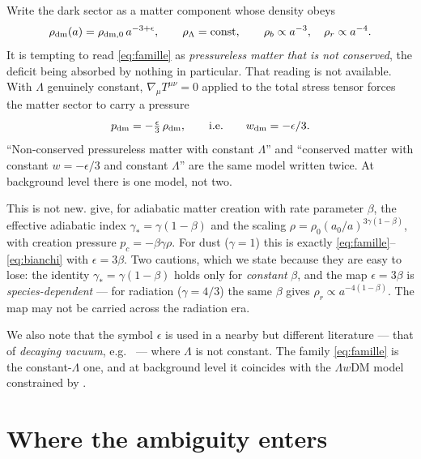 \documentclass[11pt,a4paper]{article}
\begin{document}
Write the dark sector as a matter component whose density obeys
\begin{equation}
\rho_{\rm dm}(a) = \rho_{{\rm dm},0}\,a^{-3+\epsilon},
\qquad
\rho_\Lambda = \text{const},
\qquad
\rho_b \propto a^{-3},\quad \rho_r\propto a^{-4}.
\label{eq:famille}
\end{equation}
It is tempting to read \eqref{eq:famille} as \emph{pressureless matter that is not
conserved}, the deficit being absorbed by nothing in particular. That reading is not
available. With $\Lambda$ genuinely constant, $\nabla_\mu T^{\mu\nu}=0$ applied to the total
stress tensor forces the matter sector to carry a pressure
\begin{equation}
p_{\rm dm} = -\tfrac{\epsilon}{3}\,\rho_{\rm dm},
\qquad\text{i.e.}\qquad
w_{\rm dm} = -\epsilon/3 .
\label{eq:bianchi}
\end{equation}
``Non-conserved pressureless matter with constant $\Lambda$'' and ``conserved matter with
constant $w=-\epsilon/3$ and constant $\Lambda$'' are the same model written twice. At
background level there is one model, not two.

This is not new. \citet{lima1996} give, for adiabatic matter creation with rate parameter
$\beta$, the effective adiabatic index $\gamma_\ast=\gamma(1-\beta)$ and the scaling
$\rho=\rho_0(a_0/a)^{3\gamma(1-\beta)}$, with creation pressure $p_c=-\beta\gamma\rho$. For
dust ($\gamma=1$) this is exactly \eqref{eq:famille}--\eqref{eq:bianchi} with
$\epsilon=3\beta$. Two cautions, which we state because they are easy to lose: the identity
$\gamma_\ast=\gamma(1-\beta)$ holds only for \emph{constant} $\beta$, and the map
$\epsilon=3\beta$ is \emph{species-dependent} --- for radiation ($\gamma=4/3$) the same
$\beta$ gives $\rho_r\propto a^{-4(1-\beta)}$. The map may not be carried across the
radiation era.

We also note that the symbol $\epsilon$ is used in a nearby but different literature ---
that of \emph{decaying vacuum}, e.g.\ \citet{alcaniz2005} --- where $\Lambda$ is not
constant. The family \eqref{eq:famille} is the constant-$\Lambda$ one, and at background
level it coincides with the $\Lambda w$DM model constrained by \citet{kumar2025}.

\section{Where the ambiguity enters}
\label{sec:ou}
\end{document}
